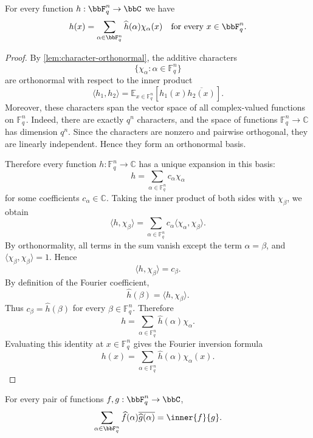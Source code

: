 \begin{lemma}
\label{lem:fourier-inversion}
\leanok
For every function $h:\bbF_q^n\to\bbC$ we have
\[
    h(x)=\sum_{\alpha\in\bbF_q^n}\widehat h(\alpha)\chi_\alpha(x)
    \quad\text{for every }x\in\bbF_q^n.
\]
\end{lemma}

\begin{proof}\leanok
By \cref{lem:character-orthonormal}, the additive characters
\[
    \{\chi_\alpha : \alpha \in \mathbb F_q^n\}
\]
are orthonormal with respect to the inner product
\[
    \langle h_1,h_2\rangle
    =
    \mathbb E_{x\in \mathbb F_q^n}
    \left[h_1(x)\overline{h_2(x)}\right].
\]
Moreover, these characters span the vector space of all complex-valued
functions on \(\mathbb F_q^n\). Indeed, there are exactly \(q^n\) characters,
and the space of functions \(\mathbb F_q^n\to\mathbb C\) has dimension \(q^n\).
Since the characters are nonzero and pairwise orthogonal, they are linearly
independent. Hence they form an orthonormal basis.

Therefore every function \(h:\mathbb F_q^n\to\mathbb C\) has a unique expansion
in this basis:
\[
    h
    =
    \sum_{\alpha\in\mathbb F_q^n}
        c_\alpha \chi_\alpha
\]
for some coefficients \(c_\alpha\in\mathbb C\). Taking the inner product of
both sides with \(\chi_\beta\), we obtain
\[
    \langle h,\chi_\beta\rangle
    =
    \sum_{\alpha\in\mathbb F_q^n}
        c_\alpha \langle \chi_\alpha,\chi_\beta\rangle .
\]
By orthonormality, all terms in the sum vanish except the term
\(\alpha=\beta\), and \(\langle \chi_\beta,\chi_\beta\rangle=1\). Hence
\[
    \langle h,\chi_\beta\rangle = c_\beta .
\]
By definition of the Fourier coefficient,
\[
    \widehat h(\beta)=\langle h,\chi_\beta\rangle .
\]
Thus \(c_\beta=\widehat h(\beta)\) for every
\(\beta\in\mathbb F_q^n\). Therefore
\[
    h
    =
    \sum_{\alpha\in\mathbb F_q^n}
        \widehat h(\alpha)\chi_\alpha .
\]
Evaluating this identity at \(x\in\mathbb F_q^n\) gives the Fourier inversion
formula
\[
    h(x)
    =
    \sum_{\alpha\in\mathbb F_q^n}
        \widehat h(\alpha)\chi_\alpha(x).
\]
\end{proof}

\begin{lemma}
\label{lem:fourier-plancherel}
\leanok
For every pair of functions $f,g:\bbF_q^n\to\bbC$,
\[
    \sum_{\alpha\in\bbF_q^n}
        \widehat f(\alpha)\overline{\widehat g(\alpha)}
    =
    \inner{f}{g}.
\]
\end{lemma}

